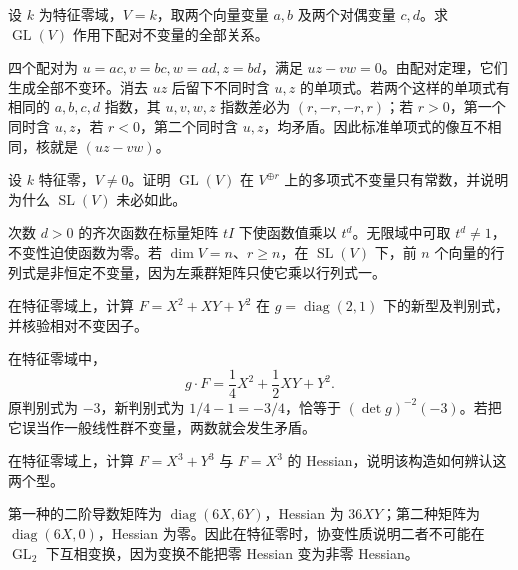 \begin{optionalexercise}\label{b5:ex:22-pairing-rank-one}
	设 \(k\) 为特征零域，\(V=k\)，取两个向量变量 \(a,b\) 及两个对偶变量 \(c,d\)。求 \(\operatorname{GL}(V)\) 作用下配对不变量的全部关系。
\end{optionalexercise}
\begin{solution}
	四个配对为 \(u=ac,v=bc,w=ad,z=bd\)，满足 \(uz-vw=0\)。由配对定理，它们生成全部不变环。消去 \(uz\) 后留下不同时含 \(u,z\) 的单项式。若两个这样的单项式有相同的 \(a,b,c,d\) 指数，其 \(u,v,w,z\) 指数差必为 \((r,-r,-r,r)\)；若 \(r>0\)，第一个同时含 \(u,z\)，若 \(r<0\)，第二个同时含 \(u,z\)，均矛盾。因此标准单项式的像互不相同，核就是 \((uz-vw)\)。
\end{solution}

\begin{optionalexercise}\label{b5:ex:22-unbalanced-polarization}
	设 \(k\) 特征零，\(V\ne0\)。证明 \(\operatorname{GL}(V)\) 在 \(V^{\oplus r}\) 上的多项式不变量只有常数，并说明为什么 \(\operatorname{SL}(V)\) 未必如此。
\end{optionalexercise}
\begin{solution}
	次数 \(d>0\) 的齐次函数在标量矩阵 \(tI\) 下使函数值乘以 \(t^d\)。无限域中可取 \(t^d\ne1\)，不变性迫使函数为零。若 \(\dim V=n\)、\(r\ge n\)，在 \(\operatorname{SL}(V)\) 下，前 \(n\) 个向量的行列式是非恒定不变量，因为左乘群矩阵只使它乘以行列式一。
\end{solution}

\begin{optionalexercise}\label{b5:ex:22-binary-quadratic}
	在特征零域上，计算 \(F=X^2+XY+Y^2\) 在 \(g=\operatorname{diag}(2,1)\) 下的新型及判别式，并核验相对不变因子。
\end{optionalexercise}
\begin{solution}
	在特征零域中，
	\[
		g\cdot F=\frac14X^2+\frac12XY+Y^2.
	\]
	原判别式为 \(-3\)，新判别式为 \(1/4-1=-3/4\)，恰等于 \((\det g)^{-2}(-3)\)。若把它误当作一般线性群不变量，两数就会发生矛盾。
\end{solution}

\begin{optionalexercise}\label{b5:ex:22-hessian-cubic}
	在特征零域上，计算 \(F=X^3+Y^3\) 与 \(F=X^3\) 的 Hessian，说明该构造如何辨认这两个型。
\end{optionalexercise}
\begin{solution}
	第一种的二阶导数矩阵为 \(\operatorname{diag}(6X,6Y)\)，Hessian 为 \(36XY\)；第二种矩阵为 \(\operatorname{diag}(6X,0)\)，Hessian 为零。因此在特征零时，协变性质说明二者不可能在 \(\operatorname{GL}_2\) 下互相变换，因为变换不能把零 Hessian 变为非零 Hessian。
\end{solution}

